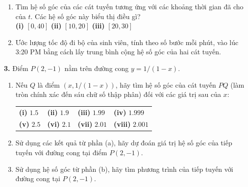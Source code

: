 \begin{minipage}[t]{0.485\textwidth}
\begin{enumerate}[label=\textbf{(\alph*)}, leftmargin=*]
    \item Tìm hệ số góc của các cát tuyến tương ứng với các khoảng thời gian đã cho của $t$. Các hệ số góc này biểu thị điều gì?\\
    \textbf{(i)} $[0, 40]$ \qquad\quad \textbf{(ii)} $[10, 20]$ \qquad\quad \textbf{(iii)} $[20, 30]$
    \item Ước lượng tốc độ đi bộ của sinh viên, tính theo số bước mỗi phút, vào lúc 3:20 PM bằng cách lấy trung bình cộng hệ số góc của hai cát tuyến.
\end{enumerate}

\vspace{5pt}
\textbf{3.} Điểm $P(2, -1)$ nằm trên đường cong $y = 1/(1 - x)$.
\begin{enumerate}[label=\textbf{(\alph*)}, leftmargin=*]
    \item Nếu $Q$ là điểm $(x, 1/(1 - x))$, hãy tìm hệ số góc của cát tuyến $PQ$ (làm tròn chính xác đến sáu chữ số thập phân) đối với các giá trị sau của $x$:
    \begin{center}
    \vspace{-1pt}
    \begin{tabular}{@{}llll@{}}
    \textbf{(i)} $1.5$ & \textbf{(ii)} $1.9$ & \textbf{(iii)} $1.99$ & \textbf{(iv)} $1.999$ \\
    \textbf{(v)} $2.5$ & \textbf{(vi)} $2.1$ & \textbf{(vii)} $2.01$ & \textbf{(viii)} $2.001$
    \end{tabular}
    \vspace{-1pt}
    \end{center}
    \item Sử dụng các kết quả từ phần (a), hãy dự đoán giá trị hệ số góc của tiếp tuyến với đường cong tại điểm $P(2, -1)$.
    \item Sử dụng hệ số góc từ phần (b), hãy tìm phương trình của tiếp tuyến với đường cong tại $P(2, -1)$.
\end{enumerate}


\end{minipage}
